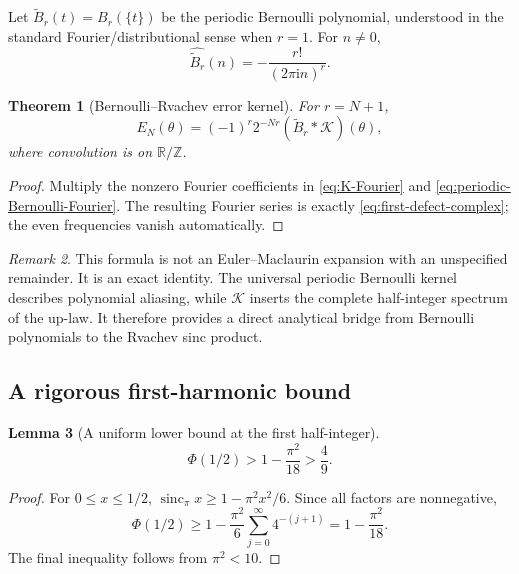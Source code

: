 \documentclass[11pt]{article}
\numberwithin{equation}{section}
\newtheorem{theorem}{Theorem}[section]
\newtheorem{lemma}[theorem]{Lemma}
\theoremstyle{definition}
\theoremstyle{remark}
\newtheorem{remark}[theorem]{Remark}
\newcommand{\R}{\mathbb R}
\newcommand{\Z}{\mathbb Z}
\newcommand{\sincpi}{\operatorname{sinc}_{\pi}}
\newcommand{\iu}{\mathrm i}
\newcommand{\Bper}{\widetilde B}
\newcommand{\Kcal}{\mathcal K}
\begin{document}
Let $\Bper_r(t)=B_r(\{t\})$ be the periodic Bernoulli polynomial, understood in the standard Fourier/distributional sense when $r=1$.  For $n\ne0$,
\begin{equation}
 \widehat{\Bper_r}(n)=-\frac{r!}{(2\pi\iu n)^r}.
 \label{eq:periodic-Bernoulli-Fourier}
\end{equation}

\begin{theorem}[Bernoulli--Rvachev error kernel]
\label{thm:Bernoulli-convolution}
For $r=N+1$,
\begin{equation}
 \boxed{\displaystyle
 E_N(\theta)=(-1)^r2^{-Nr}
 (\Bper_r*\Kcal)(\theta),}
 \label{eq:Bernoulli-convolution}
\end{equation}
where convolution is on $\R/\Z$.
\end{theorem}

\begin{proof}
Multiply the nonzero Fourier coefficients in \eqref{eq:K-Fourier} and \eqref{eq:periodic-Bernoulli-Fourier}.  The resulting Fourier series is exactly \eqref{eq:first-defect-complex}; the even frequencies vanish automatically.
\end{proof}

\begin{remark}
This formula is not an Euler--Maclaurin expansion with an unspecified remainder.  It is an exact identity.  The universal periodic Bernoulli kernel describes polynomial aliasing, while $\Kcal$ inserts the complete half-integer spectrum of the up-law.  It therefore provides a direct analytical bridge from Bernoulli polynomials to the Rvachev sinc product.
\end{remark}

\subsection{A rigorous first-harmonic bound}

\begin{lemma}[A uniform lower bound at the first half-integer]
\label{lem:phi-half-lower}
\begin{equation}
 \Phi(1/2)>1-\frac{\pi^2}{18}>\frac49.
 \label{eq:phi-half-lower}
\end{equation}
\end{lemma}

\begin{proof}
For $0\le x\le1/2$, $\sincpi x\ge1-\pi^2x^2/6$.  Since all factors are nonnegative,
\[
 \Phi(1/2)
 \ge1-\frac{\pi^2}{6}\sum_{j=0}^{\infty}4^{-(j+1)}
 =1-\frac{\pi^2}{18}.
\]
The final inequality follows from $\pi^2<10$.
\end{proof}
\end{document}

